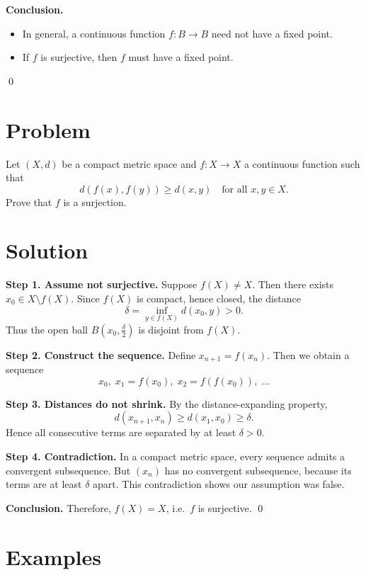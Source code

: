 \documentclass[11pt,a4paper]{article}
\theoremstyle{definition}
\theoremstyle{definition}
\theoremstyle{plain}
\theoremstyle{remark}
\begin{document}
\medskip

\textbf{Conclusion.}  
\begin{itemize}
	\item In general, a continuous function $f:B\to B$ need not have a fixed point.  
	\item If $f$ is surjective, then $f$ must have a fixed point.
\end{itemize}
\qed

\section*{Problem}
Let $(X,d)$ be a compact metric space and $f:X \to X$ a continuous function such that
\[
d(f(x), f(y)) \geq d(x,y) \quad \text{for all } x,y \in X.
\]
Prove that $f$ is a surjection.

\section*{Solution}
\textbf{Step 1. Assume not surjective.}  
Suppose $f(X) \neq X$. Then there exists $x_0 \in X \setminus f(X)$.  
Since $f(X)$ is compact, hence closed, the distance
\[
\delta = \inf_{y \in f(X)} d(x_0,y) > 0.
\]
Thus the open ball $B(x_0,\tfrac{\delta}{2})$ is disjoint from $f(X)$.

\medskip

\textbf{Step 2. Construct the sequence.}  
Define $x_{n+1} = f(x_n)$. Then we obtain a sequence
\[
x_0, \; x_1=f(x_0), \; x_2=f(f(x_0)), \; \dots
\]

\medskip

\textbf{Step 3. Distances do not shrink.}  
By the distance-expanding property,
\[
d(x_{n+1}, x_n) \geq d(x_1, x_0) \geq \delta.
\]
Hence all consecutive terms are separated by at least $\delta > 0$.

\medskip

\textbf{Step 4. Contradiction.}  
In a compact metric space, every sequence admits a convergent subsequence.  
But $(x_n)$ has no convergent subsequence, because its terms are at least $\delta$ apart.  
This contradiction shows our assumption was false.

\medskip

\textbf{Conclusion.}  
Therefore, $f(X)=X$, i.e.\ $f$ is surjective. \qed

\section*{Examples}
\end{document}
